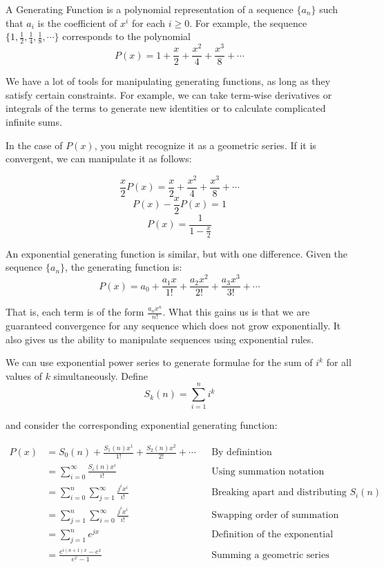 \documentclass{article}
\begin{document}
A Generating Function is a polynomial representation of a sequence $\{a_n\}$ such that
$a_i$ is the coefficient of $x^i$ for each $i \geq 0$. For example, the sequence 
$\{1, \frac{1}{2}, \frac{1}{4}, \frac{1}{8}, \cdots \}$ corresponds to the polynomial
\[ P(x) = 1 + \frac{x}{2} + \frac{x^2}{4} + \frac{x^3}{8} + \cdots \]

We have a lot of tools for manipulating generating functions, as long as they satisfy
certain constraints. For example, we can take term-wise derivatives or integrals of
the terms to generate new identities or to calculate complicated infinite sums.

In the case of $P(x)$, you might recognize it as a geometric series. If it is convergent,
we can manipulate it as follows:

\[ \frac{x}{2} P(x) = \frac{x}{2} + \frac{x^2}{4} + \frac{x^3}{8} + \cdots \]
\[ P(x) - \frac{x}{2} P(x) = 1 \]
\[ P(x) = \frac{1}{1-\frac{x}{2}} \]

An exponential generating function is similar, but with one difference. Given the sequence
$\{a_n\}$, the generating function is:
\[ P(x) = a_0 + \frac{a_1x}{1!} + \frac{a_2x^2}{2!} + \frac{a_3x^3}{3!} + \cdots \]

That is, each term is of the form $\frac{a_nx^n}{n!}$. What this gains us is that we are
guaranteed convergence for any sequence which does not grow exponentially. It also gives
us the ability to manipulate sequences using exponential rules.

We can use exponential power series to generate formulae for the sum of $i^k$ for all
values of $k$ simultaneously. Define
\[ S_k(n) = \sum_{i=1}^{n} i^k \]

and consider the corresponding exponential generating function:

\begin{align*}
	P(x) &= S_0(n) + \frac{S_1(n)x^1}{1!} + \frac{S_2(n)x^2}{2!} + \cdots 
	&  & \text{By definintion} \\
	&= \sum_{i=0}^{\infty} \frac{S_i(n)x^i}{i!} &  & \text{Using summation notation} \\
	&= \sum_{i=0}^{n} \sum_{j=1}^{\infty} \frac{j^ix^i}{i!} &  & 
	\text{Breaking apart and distributing } S_i(n) \\
	&= \sum_{j=1}^{n} \sum_{i=0}^{\infty} \frac{j^ix^i}{i!} &  & 
	\text{Swapping order of summation} \\
	&= \sum_{j=1}^{n} e^{jx} &  & \text{Definition of the exponential function} \\
	&= \frac{e^{i(n+1)x}-e^x}{e^{x}-1} &  & \text{Summing a geometric series}
\end{align*}
\end{document}
